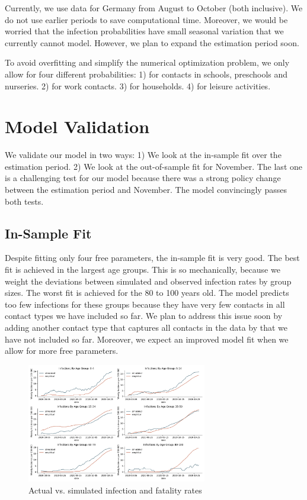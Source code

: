 Currently, we use data for Germany from August to October (both inclusive). We do not use earlier periods to save computational time. Moreover, we would be worried that the infection probabilities have small seasonal variation that we currently cannot model. However, we plan to expand the estimation period soon.

To avoid overfitting and simplify the numerical optimization problem, we only allow for four different probabilities: 1) for contacts in schools, preschools and nurseries. 2) for work contacts. 3) for households. 4) for leisure activities.


\section{Model Validation}

We validate our model in two ways: 1) We look at the in-sample fit over the estimation period. 2) We look at the out-of-sample fit for November. The last one is a challenging test for our model because there was a strong policy change between the estimation period and November. The model convincingly passes both tests.


\subsection{In-Sample Fit}

Despite fitting only four free parameters, the in-sample fit is very good. The best fit is achieved in the largest age groups. This is so mechanically, because we weight the deviations between simulated and observed infection rates by group sizes. The worst fit is achieved for the 80 to 100 years old. The model predicts too few infections for these groups because they have very few contacts in all contact types we have included so far. We plan to address this issue soon by adding another contact type that captures all contacts in the data by \cite{Mossong2008} that we have not included so far. Moreover, we expect an improved model fit when we allow for more free parameters.


\begin{figure}[!ht]
    \centering
    \includegraphics[width=0.7\textwidth]{../figures/goodness_of_fit_by_age_group}
    \caption{Actual vs. simulated infection and fatality rates}
    \label{fig:goodness_of_fit}
\end{figure}


